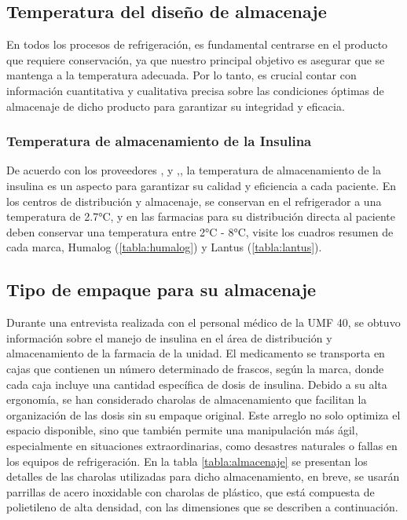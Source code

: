 \subsection{Temperatura del diseño de almacenaje}
 
En todos los procesos de refrigeración, es fundamental centrarse en el producto que requiere conservación, ya que nuestro principal objetivo es asegurar que se mantenga a la temperatura adecuada. Por lo tanto, es crucial contar con información cuantitativa y cualitativa precisa sobre las condiciones óptimas de almacenaje de dicho producto para garantizar su integridad y eficacia.
 
 \subsubsection{Temperatura de almacenamiento de la Insulina}
 
 De acuerdo con los proveedores \citeauthor{lispro-2006}, \citeyear{lispro-2006} y \citeauthor{lantus-2015},\citeyear{lantus-2015}, la temperatura de almacenamiento de la insulina es un aspecto para garantizar su calidad y eficiencia a cada paciente. En los centros de distribución y almacenaje, se conservan en el refrigerador a una temperatura de 2.7°C, y en las farmacias para su distribución directa al paciente deben conservar una temperatura entre 2°C - 8°C, visite los cuadros resumen de cada marca, Humalog (\ref{tabla:humalog}) y Lantus (\ref{tabla:lantus}).
 
 \subsection{Tipo de empaque para su almacenaje}
 
Durante una entrevista realizada con el personal médico de la UMF 40, se obtuvo información sobre el manejo de insulina en el área de distribución y almacenamiento de la farmacia de la unidad. El medicamento se transporta en cajas que contienen un número determinado de frascos, según la marca, donde cada caja incluye una cantidad específica de dosis de insulina. Debido a su alta ergonomía, se han considerado charolas de almacenamiento que facilitan la organización de las dosis sin su empaque original. Este arreglo no solo optimiza el espacio disponible, sino que también permite una manipulación más ágil, especialmente en situaciones extraordinarias, como desastres naturales o fallas en los equipos de refrigeración. En la tabla \ref{tabla:almacenaje} se presentan los detalles de las charolas utilizadas para dicho almacenamiento, en breve, se usarán parrillas de acero inoxidable con charolas de plástico, que está compuesta de polietileno de alta densidad, con las dimensiones que se describen a continuación.
